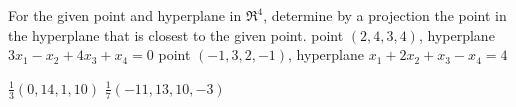 
\begin{Exercise}[
name={},
title={}, 
difficulty=0,
origin={\cite{SM}}]
For the given point and hyperplane in $\Re^4$, determine by a projection the point in the hyperplane that is closest to the given point.
\Question point $(2,4,3,4)$, hyperplane $3x_1-x_2+4x_3+x_4=0$
\Question point $(-1,3,2,-1)$, hyperplane $x_1+2x_2+x_3-x_4=4$
\end{Exercise}

\begin{Answer}
\Question $\frac{1}{3}(0,14,1,10)$
\Question $\frac{1}{7}(-11,13,10,-3)$
\end{Answer}
